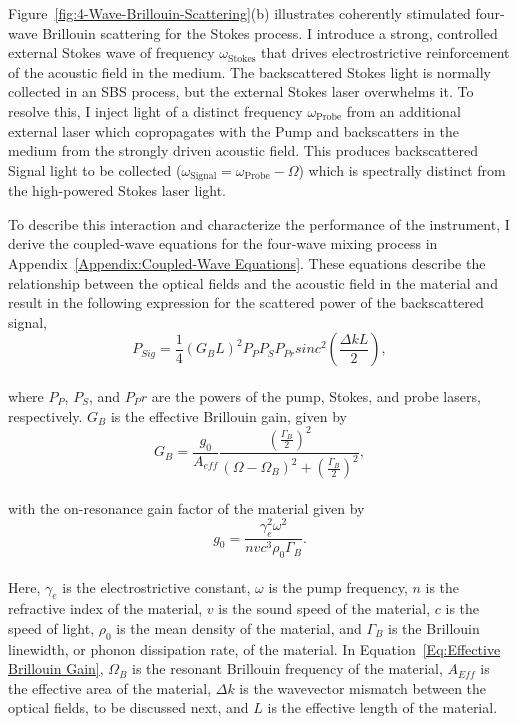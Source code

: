 Figure~\ref{fig:4-Wave-Brillouin-Scattering}(b) illustrates coherently stimulated four-wave Brillouin scattering for the Stokes process. I introduce a strong, controlled external Stokes wave of frequency \(\omega_{\mathrm{Stokes}}\) that drives electrostrictive reinforcement of the acoustic field in the medium. The backscattered Stokes light is normally collected in an \ac{SBS} process, but the external Stokes laser overwhelms it. To resolve this, I inject light of a distinct frequency \(\omega_{\mathrm{Probe}}\) from an additional external laser which copropagates with the Pump and backscatters in the medium from the strongly driven acoustic field. This produces backscattered Signal light to be collected (\(\omega_{\mathrm{Signal}} = \omega_{\mathrm{Probe}} - \Omega\)) which is spectrally distinct from the high-powered Stokes laser light.

To describe this interaction and characterize the performance of the instrument, I derive the coupled-wave equations for the four-wave mixing process in Appendix~\ref{Appendix:Coupled-Wave Equations}. These equations describe the relationship between the optical fields and the acoustic field in the material and result in the following expression for the scattered power of the backscattered signal,
\\
\begin{equation}
  P_{Sig} = \frac{1}{4}(G_{B}L)^{2}P_{P}P_{S}P_{Pr}sinc^{2}\left(\frac{\Delta kL}{2}\right),
  \label{Eq:Theoretical Framework:Scattered Power}
\end{equation}
\\
where \(P_P\), \(P_S\), and \(P_Pr\) are the powers of the pump, Stokes, and probe lasers, respectively. \(G_B\) is the effective Brillouin gain, given by
\\
\begin{equation}
  G_{B} = \frac{g_{0}}{A_{eff}}\frac{\left(\frac{\Gamma_{B}}{2}\right)^{2}}{(\Omega - \Omega_{B})^{2} + \left(\frac{\Gamma_{B}}{2}\right)^{2}},
  \label{Eq:Effective Brillouin Gain}
\end{equation}
\\
with the on-resonance gain factor of the material given by
\\
\begin{equation}
  g_{0} = \frac{\gamma_{e}^{2}\omega^{2}}{nvc^{3}\rho_{0}\Gamma_{B}}.
\end{equation}
\\
Here, \(\gamma_e\) is the electrostrictive constant, \(\omega\) is the pump frequency, \(n\) is the refractive index of the material, \(v\) is the sound speed of the material, \(c\) is the speed of light, \(\rho_0\) is the mean density of the material, and \(\Gamma_B\) is the Brillouin linewidth, or phonon dissipation rate, of the material. In Equation~\ref{Eq:Effective Brillouin Gain}, \(\Omega_B\) is the resonant Brillouin frequency of the material, \(A_{Eff}\) is the effective area of the material, \(\Delta k\) is the wavevector mismatch between the optical fields, to be discussed next, and \(L\) is the effective length of the material.


